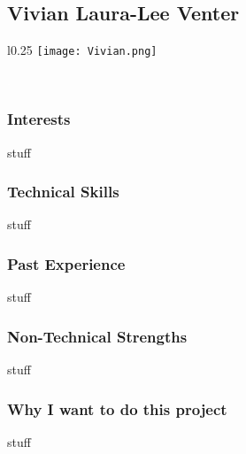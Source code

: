 \subsection{Vivian Laura-Lee Venter}
\begin{wrapfigure}[7]{l}{0.25\textwidth}
\vspace{10pt}
\texttt{[image: Vivian.png]}
\end{wrapfigure}

\textcolor{white}{.}
\subsubsection{Interests} stuff
\subsubsection{Technical Skills} stuff
\subsubsection{Past Experience} stuff
\subsubsection{Non-Technical Strengths} stuff
\subsubsection{Why I want to do this project} stuff
